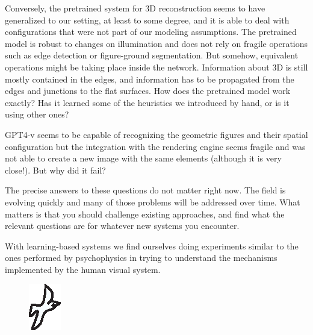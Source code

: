 Conversely, the pretrained system for 3D reconstruction seems to have generalized to our setting, at least to some degree, and it is able to deal with configurations that were not part of our modeling assumptions. The pretrained model is robust to changes on illumination and does not rely on fragile operations such as edge detection or figure-ground segmentation. But somehow, equivalent operations might be taking place inside the network. Information about 3D is still mostly contained in the edges, and information has to be propagated from the edges and junctions to the flat surfaces. How does the pretrained model work exactly? Has it learned some of the heuristics we introduced by hand, or is it using other ones? 

GPT4-v seems to be capable of recognizing the geometric figures and their spatial configuration but the integration with the rendering engine seems fragile and was not able to create a new image with the same elements (although it is very close!). But why did it fail? 

The precise answers to these questions do not matter right now. The field is evolving quickly and many of those problems will be addressed over time. What matters is that you should challenge existing approaches, and find what the relevant questions are for whatever new systems you encounter. 

With learning-based systems we find ourselves doing experiments similar to the ones performed by psychophysics in trying to understand the mechanisms implemented by the human visual system. 

\begin{figure}
\centerline{
\includegraphics[width=.06\linewidth]{figures/simplesystem_revisited/gibson_bird.eps}
} 
\end{figure}



